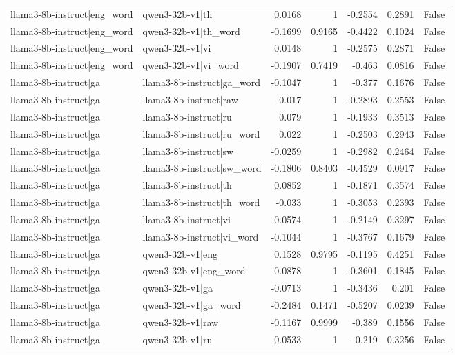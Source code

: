 \begin{table}
\begin{tabular}{l l r r r r l}
llama3-8b-instruct|eng_word & qwen3-32b-v1|th & 0.0168 & 1 & -0.2554 & 0.2891 & False \\
llama3-8b-instruct|eng_word & qwen3-32b-v1|th_word & -0.1699 & 0.9165 & -0.4422 & 0.1024 & False \\
llama3-8b-instruct|eng_word & qwen3-32b-v1|vi & 0.0148 & 1 & -0.2575 & 0.2871 & False \\
llama3-8b-instruct|eng_word & qwen3-32b-v1|vi_word & -0.1907 & 0.7419 & -0.463 & 0.0816 & False \\
llama3-8b-instruct|ga & llama3-8b-instruct|ga_word & -0.1047 & 1 & -0.377 & 0.1676 & False \\
llama3-8b-instruct|ga & llama3-8b-instruct|raw & -0.017 & 1 & -0.2893 & 0.2553 & False \\
llama3-8b-instruct|ga & llama3-8b-instruct|ru & 0.079 & 1 & -0.1933 & 0.3513 & False \\
llama3-8b-instruct|ga & llama3-8b-instruct|ru_word & 0.022 & 1 & -0.2503 & 0.2943 & False \\
llama3-8b-instruct|ga & llama3-8b-instruct|sw & -0.0259 & 1 & -0.2982 & 0.2464 & False \\
llama3-8b-instruct|ga & llama3-8b-instruct|sw_word & -0.1806 & 0.8403 & -0.4529 & 0.0917 & False \\
llama3-8b-instruct|ga & llama3-8b-instruct|th & 0.0852 & 1 & -0.1871 & 0.3574 & False \\
llama3-8b-instruct|ga & llama3-8b-instruct|th_word & -0.033 & 1 & -0.3053 & 0.2393 & False \\
llama3-8b-instruct|ga & llama3-8b-instruct|vi & 0.0574 & 1 & -0.2149 & 0.3297 & False \\
llama3-8b-instruct|ga & llama3-8b-instruct|vi_word & -0.1044 & 1 & -0.3767 & 0.1679 & False \\
llama3-8b-instruct|ga & qwen3-32b-v1|eng & 0.1528 & 0.9795 & -0.1195 & 0.4251 & False \\
llama3-8b-instruct|ga & qwen3-32b-v1|eng_word & -0.0878 & 1 & -0.3601 & 0.1845 & False \\
llama3-8b-instruct|ga & qwen3-32b-v1|ga & -0.0713 & 1 & -0.3436 & 0.201 & False \\
llama3-8b-instruct|ga & qwen3-32b-v1|ga_word & -0.2484 & 0.1471 & -0.5207 & 0.0239 & False \\
llama3-8b-instruct|ga & qwen3-32b-v1|raw & -0.1167 & 0.9999 & -0.389 & 0.1556 & False \\
llama3-8b-instruct|ga & qwen3-32b-v1|ru & 0.0533 & 1 & -0.219 & 0.3256 & False \\

\end{tabular}
\end{table}
